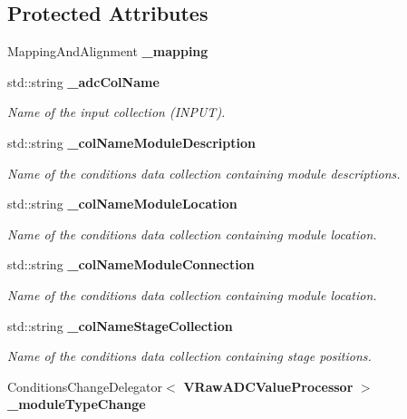 \subsection*{Protected Attributes}
\begin{DoxyCompactItemize}
\item 
MappingAndAlignment {\bfseries \_\-mapping}\label{classCALICE_1_1VRawADCValueProcessor_a04dcae798efd66211f1fe66686e2fb60}

\item 
std::string {\bf \_\-adcColName}
\begin{DoxyCompactList}\small\item\em Name of the input collection (INPUT). \item\end{DoxyCompactList}\item 
std::string {\bf \_\-colNameModuleDescription}
\begin{DoxyCompactList}\small\item\em Name of the conditions data collection containing module descriptions. \item\end{DoxyCompactList}\item 
std::string {\bf \_\-colNameModuleLocation}
\begin{DoxyCompactList}\small\item\em Name of the conditions data collection containing module location. \item\end{DoxyCompactList}\item 
std::string {\bf \_\-colNameModuleConnection}
\begin{DoxyCompactList}\small\item\em Name of the conditions data collection containing module location. \item\end{DoxyCompactList}\item 
std::string {\bf \_\-colNameStageCollection}
\begin{DoxyCompactList}\small\item\em Name of the conditions data collection containing stage positions. \item\end{DoxyCompactList}\item 
ConditionsChangeDelegator$<$ {\bf VRawADCValueProcessor} $>$ {\bf \_\-moduleTypeChange}\label{classCALICE_1_1VRawADCValueProcessor_af8af90b149e3fe18b894756535eb2cfe}


\end{DoxyCompactItemize}
